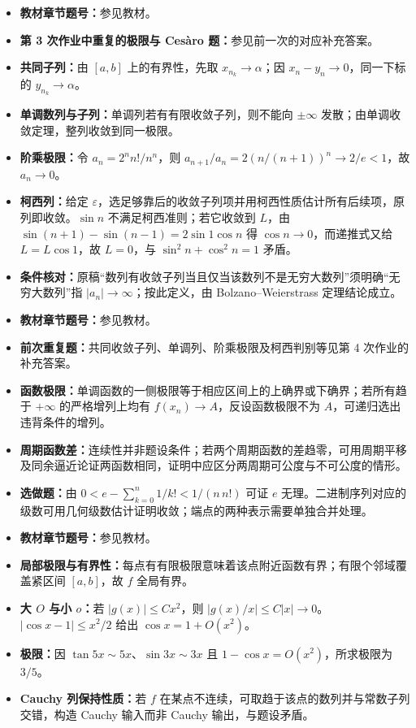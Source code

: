 \begin{itemize}
\item \textbf{教材章节题号：}参见教材。
\item \textbf{第 3 次作业中重复的极限与 Cesàro 题：}参见前一次的对应补充答案。
\item \textbf{共同子列：}由 $[a,b]$ 上的有界性，先取 $x_{n_k}\to\alpha$；因 $x_n-y_n\to0$，同一下标的 $y_{n_k}\to\alpha$。
\item \textbf{单调数列与子列：}单调列若有有限收敛子列，则不能向 $\pm\infty$ 发散；由单调收敛定理，整列收敛到同一极限。
\item \textbf{阶乘极限：}令 $a_n=2^nn!/n^n$，则 $a_{n+1}/a_n=2(n/(n+1))^n\to2/e<1$，故 $a_n\to0$。
\item \textbf{柯西列：}给定 $\varepsilon$，选足够靠后的收敛子列项并用柯西性质估计所有后续项，原列即收敛。$\sin n$ 不满足柯西准则；若它收敛到 $L$，由 $\sin(n+1)-\sin(n-1)=2\sin1\cos n$ 得 $\cos n\to0$，而递推式又给 $L=L\cos1$，故 $L=0$，与 $\sin^2n+\cos^2n=1$ 矛盾。
\item \textbf{条件核对：}原稿“数列有收敛子列当且仅当该数列不是无穷大数列”须明确“无穷大数列”指 $|a_n|\to\infty$；按此定义，由 Bolzano--Weierstrass 定理结论成立。
\end{itemize}

\begin{itemize}
\item \textbf{教材章节题号：}参见教材。
\item \textbf{前次重复题：}共同收敛子列、单调列、阶乘极限及柯西判别等见第 4 次作业的补充答案。
\item \textbf{函数极限：}单调函数的一侧极限等于相应区间上的上确界或下确界；若所有趋于 $+\infty$ 的严格增列上均有 $f(x_n)\to A$，反设函数极限不为 $A$，可递归选出违背条件的增列。
\item \textbf{周期函数差：}连续性并非题设条件；若两个周期函数的差趋零，可用周期平移及同余逼近论证两函数相同，证明中应区分两周期可公度与不可公度的情形。
\item \textbf{选做题：}由 $0<e-\sum_{k=0}^n1/k!<1/(n\,n!)$ 可证 $e$ 无理。二进制序列对应的级数可用几何级数估计证明收敛；端点的两种表示需要单独合并处理。
\end{itemize}

\begin{itemize}
\item \textbf{教材章节题号：}参见教材。
\item \textbf{局部极限与有界性：}每点有有限极限意味着该点附近函数有界；有限个邻域覆盖紧区间 $[a,b]$，故 $f$ 全局有界。
\item \textbf{大 $O$ 与小 $o$：}若 $|g(x)|\le Cx^2$，则 $|g(x)/x|\le C|x|\to0$。$|\cos x-1|\le x^2/2$ 给出 $\cos x=1+O(x^2)$。
\item \textbf{极限：}因 $\tan5x\sim5x$、$\sin3x\sim3x$ 且 $1-\cos x=O(x^2)$，所求极限为 $3/5$。
\item \textbf{Cauchy 列保持性质：}若 $f$ 在某点不连续，可取趋于该点的数列并与常数子列交错，构造 Cauchy 输入而非 Cauchy 输出，与题设矛盾。
\end{itemize}

